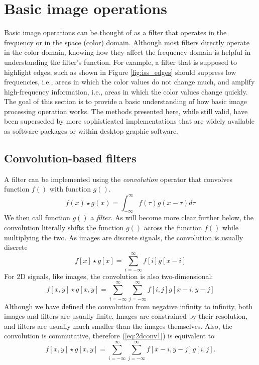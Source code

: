 \section{Basic image operations}
Basic image operations can be thought of as a filter that operates in the frequency or in the space (color) domain. Although most filters directly operate in the color domain, knowing how they affect the frequency domain is helpful in understanding the filter's function. For example, a filter that is supposed to highlight edges, such as shown in Figure \ref{fig:iss_edges} should suppress low frequencies, i.e., areas in which the color values do not change much, and amplify high-frequency information, i.e., areas in which the color values change quickly. The goal of this section is to provide a basic understanding of how basic image processing operation works. The methods presented here, while still valid, have been superseded by more sophisticated implementations that are widely available as software packages or within desktop graphic software.

\subsection{Convolution-based filters}
 A filter can be implemented using the \emph{convolution}  operator that convolves function $f()$ with function $g()$. 
\begin{equation}
f(x)\star g(x)=\int_{-\infty}^{\infty}f(\tau)g(x-\tau)d\tau
\end{equation}
We then call function $g()$ a \emph{filter}. As will become more clear further below, the convolution literally shifts the function $g()$ across the function $f()$ while multiplying the two. As images are discrete signals, the convolution is usually discrete
\begin{equation}
f[x]\star g[x]=\sum_{i=-\infty}^{\infty}f[i]g[x-i]
\end{equation} 
For 2D signals, like images, the convolution is also two-dimensional:
\begin{equation}\label{eq:2dconv1}
f[x,y]\star g[x,y]=\sum_{i=-\infty}^{\infty}\sum_{j=-\infty}^{\infty}f[i,j]g[x-i,y-j]
\end{equation}
Although we have defined the convolution from negative infinity to infinity, both images and filters are usually finite. Images are constrained by their resolution, and filters are usually much smaller than the images themselves. Also, the convolution is commutative, therefore (\ref{eq:2dconv1}) is equivalent to 
\begin{equation}\label{eq:2dconv2}
f[x,y]\star g[x,y]=\sum_{i=-\infty}^{\infty}\sum_{j=-\infty}^{\infty}f[x-i,y-j]g[i,j].
\end{equation}


